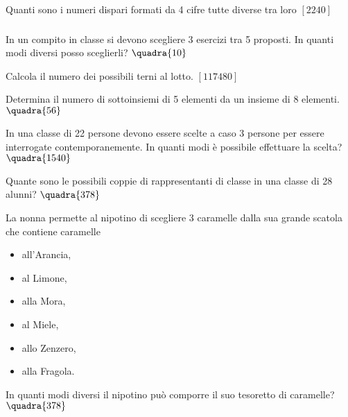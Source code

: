 \begin{esercizio}\label{D.5}
Quanti sono i numeri dispari formati da 4 cifre tutte diverse tra loro
\hfill \(\left[2240\right]\)
\end{esercizio}

\subsubsection*{}

\begin{esercizio}
\label{ese:C.1}
In un compito in classe si devono scegliere 3 esercizi tra 5 proposti. In 
quanti modi diversi posso sceglierli? \hfill \(\quadra{10}\)
\end{esercizio}

\begin{esercizio}
\label{ese:C.2}
Calcola il numero dei possibili terni al lotto.
\hfill \(\left[117480\right]\)
\end{esercizio}

\begin{esercizio}
\label{ese:C.3}
Determina il numero di sottoinsiemi di 5 elementi da un insieme di 8 
elementi. \hfill \(\quadra{56}\)
\end{esercizio}

\begin{esercizio}
\label{ese:C.4}
In una classe di 22 persone devono essere scelte a caso 3 persone per essere 
interrogate contemporanemente. In quanti modi è possibile effettuare la 
scelta? \hfill \(\quadra{1540}\)
\end{esercizio}

\begin{esercizio}
\label{ese:C.5}
Quante sono le possibili coppie di rappresentanti di classe in una classe di 
28 alunni? \hfill \(\quadra{378}\)
\end{esercizio}

\begin{esercizio}
\label{ese:C.5}
La nonna permette al nipotino di scegliere 3 caramelle dalla sua grande 
scatola che contiene caramelle
\begin{itemize}[nosep]
\item all'Arancia,
\item al Limone,
\item alla Mora,
\item al Miele,
\item allo Zenzero,
\item alla Fragola.
\end{itemize}
In quanti modi diversi il nipotino può comporre il suo tesoretto di 
caramelle? \hfill \(\quadra{378}\)
\end{esercizio}


